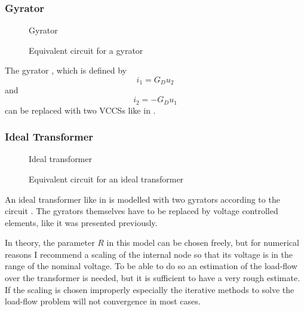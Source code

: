 \subsubsection{Gyrator}

\begin{figure}
	\centering
	
	\caption{Gyrator}
	\label{fig:gyrator_original}
\end{figure}

\begin{figure}
	\centering
	
	\caption{Equivalent circuit for a gyrator}
	\label{fig:gyrator_equivalent}
\end{figure}

The gyrator , which is defined by
\begin{equation}
	i_1 = G_D u_2
\end{equation}
and
\begin{equation}
	i_2 = -G_D u_1
\end{equation}
can be replaced with two VCCSs like in .

\subsubsection{Ideal Transformer}

\begin{figure}
	\centering
	
	\caption{Ideal transformer}
	\label{fig:ideal_transformer_original}
\end{figure}

\begin{figure}
	\centering
	
	\caption{Equivalent circuit for an ideal transformer}
	\label{fig:ideal_transformer_equivalent}
\end{figure}

An ideal transformer like in  is modelled with two gyrators according to the circuit . The gyrators themselves have to be replaced by voltage controlled elements, like it was presented previously.

In theory, the parameter $R$ in this model can be chosen freely, but for numerical reasons I recommend a scaling of the internal node so that its voltage is in the range of the nominal voltage. To be able to do so an estimation of the load-flow over the transformer is needed, but it is sufficient to have a very rough estimate. If the scaling is chosen improperly especially the iterative methods to solve the load-flow problem will not convergence in most cases.


